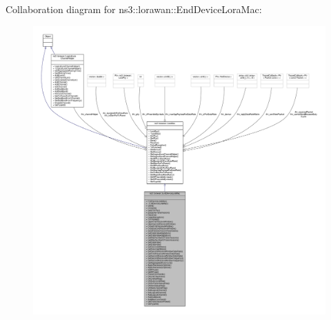 Collaboration diagram for ns3\+:\+:lorawan\+:\+:End\+Device\+Lora\+Mac\+:
\nopagebreak
\begin{figure}[H]
\begin{center}
\leavevmode
\includegraphics[width=350pt]{classns3_1_1lorawan_1_1EndDeviceLoraMac__coll__graph}
\end{center}
\end{figure}

